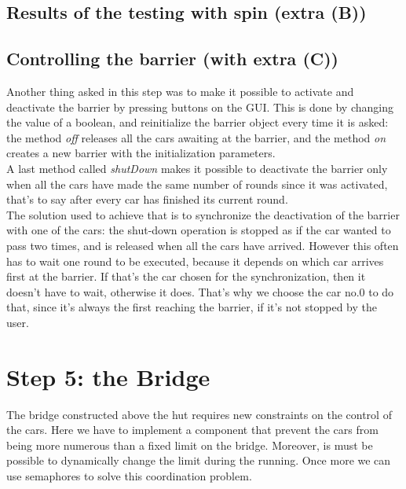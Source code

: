 \documentclass[a4paper,12pt,twoside]{article}
\begin{document}
\subsection{Results of the testing with spin (extra (B))}


\subsection{Controlling the barrier (with extra (C))}
Another thing asked in this step was to make it possible to activate and deactivate the barrier by pressing buttons on the GUI. This is done by changing the value of a boolean, and reinitialize the barrier object every time it is asked: the method \textit{off} releases all the cars awaiting at the barrier, and the method \textit{on} creates a new barrier with the initialization parameters.\\

\noindent A last method called \textit{shutDown} makes it possible to deactivate the barrier only when all the cars have made the same number of rounds since it was activated, that's to say after every car has finished its current round.\\
The solution used to achieve that is to synchronize the deactivation of the barrier with one of the cars: the shut-down operation is stopped as if the car wanted to pass two times, and is released when all the cars have arrived. However this often has to wait one round to be executed, because it depends on which car arrives first at the barrier. If that's the car chosen for the synchronization, then it doesn't have to wait, otherwise it does. That's why we choose the car no.0 to do that, since it's always the first reaching the barrier, if it's not stopped by the user.

\section{Step 5: the Bridge}

The bridge constructed above the hut requires new constraints on the control of the cars. Here we have to implement a component that prevent the cars from being more numerous than a fixed limit on the bridge. Moreover, is must be possible to dynamically change the limit during the running. Once more we can use semaphores to solve this coordination problem.
\end{document}
